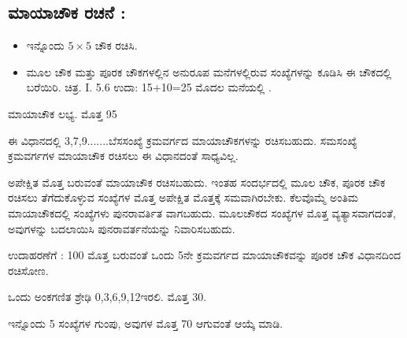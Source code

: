 \subsection*{ಮಾಯಾಚೌಕ ರಚನೆ :}

\begin{itemize}
	\item ಇನ್ನೊಂದು $5 \times 5$ ಚೌಕ ರಚಿಸಿ.
	\item ಮೂಲ ಚೌಕ ಮತ್ತು ಪೂರಕ ಚೌಕಗಳಲ್ಲಿನ ಅನುರೂಪ ಮನೆಗಳಲ್ಲಿರುವ ಸಂಖ್ಯೆಗಳನ್ನು ಕೂಡಿಸಿ ಈ ಚೌಕದಲ್ಲಿ ಬರೆಯಿರಿ. ಚಿತ್ರ. I. 5.6
	ಉದಾ: 15+10=25 ಮೊದಲ ಮನೆಯಲ್ಲಿ .
\end{itemize}

	ಮಾಯಾಚೌಕ ಲಭ್ಯ. ಮೊತ್ತ 95

	ಈ ವಿಧಾನದಲ್ಲಿ 3,7,9.......ಬೆಸಸಂಖ್ಯೆ ಕ್ರಮವರ್ಗದ ಮಾಯಾಚೌಕಗಳನ್ನು ರಚಿಸ\-ಬಹುದು. ಸಮಸಂಖ್ಯೆ ಕ್ರಮವರ್ಗಗಳ ಮಾಯಾಚೌಕ ರಚಿಸಲು ಈ ವಿಧಾನದಂತೆ ಸಾಧ್ಯವಿಲ್ಲ.
\eject

ಅಪೇಕ್ಷಿತ ಮೊತ್ತ ಬರುವಂತೆ ಮಾಯಾಚೌಕ ರಚಿಸಬಹುದು. ಇಂತಹ ಸಂದರ್ಭದಲ್ಲಿ ಮೂಲ ಚೌಕ, ಪೂರಕ ಚೌಕ ರಚಿಸಲು ತೆಗೆದುಕೊಳ್ಳುವ ಸಂಖ್ಯೆಗಳ ಮೊತ್ತ ಅಪೇಕ್ಷಿತ \hbox{ಮೊತ್ತಕ್ಕೆ} ಸಮವಾಗಿರಬೇಕು. ಕೆಲವೊಮ್ಮೆ ಅಂತಿಮ ಮಾಯಾಚೌಕದಲ್ಲಿ ಸಂಖ್ಯೆಗಳು ಪುನರಾವರ್ತಿತ ವಾಗಬಹುದು. ಮೂಲಚೌಕದ ಸಂಖ್ಯೆಗಳ ಮೊತ್ತ ವ್ಯತ್ಯಾಸವಾಗದಂತೆ, ಅವುಗಳನ್ನು \hbox{ಬದಲಾಯಿಸಿ} ಪುನರಾವರ್ತನೆಯನ್ನು ನಿವಾರಿಸಬಹುದು.

ಉದಾಹರಣೆಗೆ : 100 ಮೊತ್ತ ಬರುವಂತೆ ಒಂದು 5ನೇ ಕ್ರಮವರ್ಗದ ಮಾಯಾಚೌಕ\-ವನ್ನು ಪೂರಕ ಚೌಕ ವಿಧಾನದಿಂದ ರಚಿಸೋಣ.

ಒಂದು ಅಂಕಗಣಿತ ಶ್ರೇಢಿ 0,3,6,9,12ಇರಲಿ. ಮೊತ್ತ 30.

ಇನ್ನೊಂದು 5 ಸಂಖ್ಯೆಗಳ ಗುಂಪು, ಅವುಗಳ ಮೊತ್ತ 70 ಆಗುವಂತೆ ಆಯ್ಕೆ ಮಾಡಿ.

